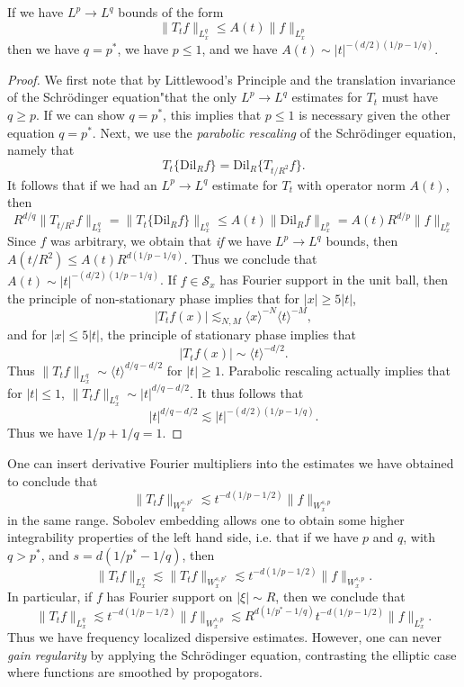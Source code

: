 \begin{theorem}
	If we have $L^p \to L^q$ bounds of the form
	\[ \| T_t f \|_{L^q_x} \leq A(t) \| f \|_{L^p_x} \]
	then we have $q = p^*$, we have $p \leq 1$, and we have $A(t) \sim |t|^{-(d/2)(1/p - 1/q)}$.
\end{theorem}
\begin{proof}
	We first note that by Littlewood's Principle and the translation invariance of the Schr\"{o}dinger equation"that the only $L^p \to L^q$ estimates for $T_t$ must have $q \geq p$. If we can show $q = p^*$, this implies that $p \leq 1$ is necessary given the other equation $q = p^*$. Next, we use the \emph{parabolic rescaling} of the Schr\"{o}dinger equation, namely that
	\[ T_t \{ \text{Dil}_R f \} = \text{Dil}_R \{ T_{t/R^2} f \}. \]
	It follows that if we had an $L^p \to L^q$ estimate for $T_t$ with operator norm $A(t)$, then
	\[ R^{d/q} \| T_{t/R^2} f \|_{L^q_x} = \| T_t \{ \text{Dil}_R f \} \|_{L^q_x} \leq A(t) \| \text{Dil}_R f \|_{L^p_x} = A(t) R^{d/p} \| f \|_{L^p_x} \]
	Since $f$ was arbitrary, we obtain that \emph{if} we have $L^p \to L^q$ bounds, then $A(t/R^2) \leq A(t) R^{d(1/p - 1/q)}$. Thus we conclude that $A(t) \sim |t|^{-(d/2)(1/p - 1/q)}$. If $f \in \mathcal{S}_x$ has Fourier support in the unit ball, then the principle of non-stationary phase implies that for $|x| \geq 5|t|$,
	\[ |T_t f(x)| \lesssim_{N,M} \langle x \rangle^{-N} \langle t \rangle^{-M}, \]
	and for $|x| \leq 5|t|$, the principle of stationary phase implies that
	\[ |T_t f(x)| \sim \langle t \rangle^{-d/2}. \]
	Thus $\| T_t f \|_{L^q_x} \sim \langle t \rangle^{d/q - d/2}$ for $|t| \geq 1$. Parabolic rescaling actually implies that for $|t| \leq 1$, $\| T_t f \|_{L^q_x} \sim |t|^{d/q - d/2}$. It thus follows that
	\[ |t|^{d/q-d/2} \lesssim |t|^{-(d/2)(1/p - 1/q)}. \]
	Thus we have $1/p + 1/q = 1$.
\end{proof}

One can insert derivative Fourier multipliers into the estimates we have obtained to conclude that
%
\[ \| T_t f \|_{W_x^{s,p^*}} \lesssim t^{-d(1/p - 1/2)} \| f \|_{W_x^{s,p}} \]
%
in the same range. Sobolev embedding allows one to obtain some higher integrability properties of the left hand side, i.e. that if we have $p$ and $q$, with $q > p^*$, and $s = d(1/p^* - 1/q)$, then
\[ \| T_t f \|_{L^q_x} \lesssim \| T_t f \|_{W^{s,p^*}_x} \lesssim t^{-d(1/p - 1/2)} \| f \|_{W_x^{s,p}}. \]
%
In particular, if $f$ has Fourier support on $|\xi| \sim R$, then we conclude that
%
\[ \| T_t f \|_{L^q_x} \lesssim t^{-d(1/p - 1/2)} \| f \|_{W_x^{s,p}} \lesssim R^{d(1/p^* - 1/q)} t^{-d(1/p - 1/2)} \| f \|_{L^p_x}. \]
%
Thus we have frequency localized dispersive estimates. However, one can never \emph{gain regularity} by applying the Schr\"{o}dinger equation, contrasting the elliptic case where functions are smoothed by propogators.


